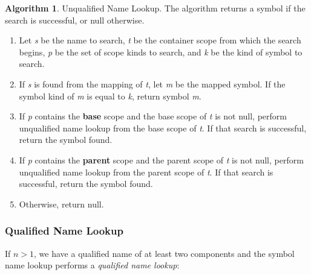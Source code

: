 \documentclass[a4paper,oneside,11pt]{book}
\theoremstyle{definition}
\newtheorem{algo}{Algorithm}[section]
\begin{document}
\begin{algo}\label{unqualified} Unqualified Name Lookup.
The algorithm returns a symbol if the search is successful, or null otherwise.
\begin{enumerate}
\item
Let \emph{s} be the name to search, \emph{t} be the container scope from which the search begins,
\emph{p} be the set of scope kinds to search, and \emph{k} be the kind of symbol to search.
\item
If \emph{s} is found from the mapping of \emph{t}, let \emph{m} be the mapped symbol.
If the symbol kind of \emph{m} is equal to \emph{k}, return symbol \emph{m}.
\item
If \emph{p} contains the \textbf{base} scope and the base scope of \emph{t} is not null,
perform unqualified name lookup from the base scope of \emph{t}.
If that search is successful, return the symbol found.
\item
If \emph{p} contains the \textbf{parent} scope and the parent scope of \emph{t} is not null,
perform unqualified name lookup from the parent scope of \emph{t}.
If that search is successful, return the symbol found.
\item
Otherwise, return null.
\end{enumerate}
\end{algo}

\subsubsection{Qualified Name Lookup}

If $n > 1$, we have a qualified name of at least two components and the symbol name lookup performs a
\emph{qualified name lookup}:
\end{document}
